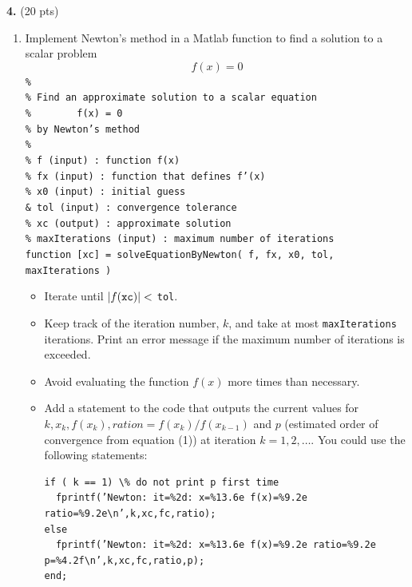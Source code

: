 \documentclass[10pt,letterpaper]{article}
\begin{document}
\noindent\textbf{4.} (20 pts)

\begin{enumerate}

\item Implement Newton's method in a Matlab function to find a solution to a scalar problem
$$f(x) = 0$$
{\tt \% \\
\% Find an approximate solution to a scalar equation\\
\% \ \ \ \ \ \ \ f(x) = 0\\
\% by Newton's method\\
\%\\
\% f (input) : function f(x)\\
\% fx (input) : function that defines f'(x)\\
\% x0 (input) : initial guess\\
\& tol (input) : convergence tolerance\\
\% xc (output) : approximate solution\\
\% maxIterations (input) : maximum number of iterations\\
function [xc] = solveEquationByNewton( f, fx, x0, tol, maxIterations )}

\begin{itemize}

\item Iterate until $|f({\tt xc})| < $ {\tt tol}.

\item Keep track of the iteration number, $k$, and take at most {\tt maxIterations} iterations. Print an error message if the maximum number of iterations is exceeded.

\item Avoid evaluating the function $f(x)$ more times than necessary.

\item Add a statement to the code that outputs the current values for $k, x_{k}, f(x_{k}), ration = f(x_{k})/f(x_{k - 1})$ and $p$ (estimated order of convergence from equation (1)) at iteration $k = 1, 2, \dots$. You could use the following statements:

\begin{verbatim}
if ( k == 1) \% do not print p first time
  fprintf(’Newton: it=%2d: x=%13.6e f(x)=%9.2e ratio=%9.2e\n’,k,xc,fc,ratio);
else
  fprintf(’Newton: it=%2d: x=%13.6e f(x)=%9.2e ratio=%9.2e p=%4.2f\n’,k,xc,fc,ratio,p);
end;
\end{verbatim}

\end{itemize}


\end{enumerate}
\end{document}
